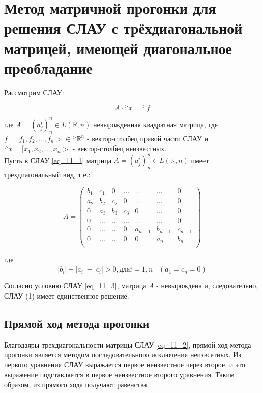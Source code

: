 \documentclass[__main__.tex]{subfiles}
\begin{document}
\section{Метод матричной прогонки для решения СЛАУ с трёхдиагональной матрицей, имеющей диагональное преобладание}

Рассмотрим СЛАУ:

\begin{equation}
\label{eq_11_1}
A \cdot {}^{>}x = {}^{>}f
\end{equation}

где $A = (a^i_j)^n_n \in L(\mathbb{R}, n)$ невырожденная квадратная матрица,
где $f = [f_1, f_2, \text{...}, f_n> \in {}^{>}\mathbb{R}^n$ - вектор-столбец правой части СЛАУ и ${}^{>}x = [x_1, x_2, \text{...}, x_n>$ - вектор-столбец неизвестных.\\

Пусть в СЛАУ \ref{eq_11_1} матрица $A = (a^i_j)^n_n \in L(\mathbb{R}, n)$ имеет трехдиагональный вид, т.е.:

\begin{equation}
\label{eq_11_2}
A = \begin{pmatrix}
b_1 & c_1 & 0 & \hdots & \hdots & \hdots & 0 \\
a_2 & b_2 & c_2 & 0 & \hdots & \hdots & 0 \\
0 & a_3 & b_3 & c_3 & 0 & \hdots & 0 \\
0 & \hdots & \hdots & \hdots & \hdots & \hdots & 0 \\
0 & \hdots & \hdots & 0 & a_{n-1} & b_{n-1} & c_{n - 1}\\
0 & \hdots & \hdots & 0 & 0 & a_n & b_n\\ 
\end{pmatrix}
\end{equation}

где 
\begin{equation}
\label{eq_11_3}
|b_i| - |a_i| - |c_i| > 0, \text{для} i = \overline{1, n} \;\;\; (a_1 = c_n = 0)
\end{equation}

Согласно условию СЛАУ \ref{eq_11_3}, матрица $A$ - невырождена и, следовательно, СЛАУ (1) имеет единственное решение.

\subsection{Прямой ход метода прогонки}

Благодаяры трехдиагональности матрицы СЛАУ \ref{eq_11_2}, прямой ход метода прогонки является методом последовательного исключения неизвсетных. Из  первого уравнения СЛАУ выражается первое неизвестное через второе, и это выражение подставляется в первое неизвестное второго уравнения. Таким образом, из прямого хода получают равенства
\end{document}
